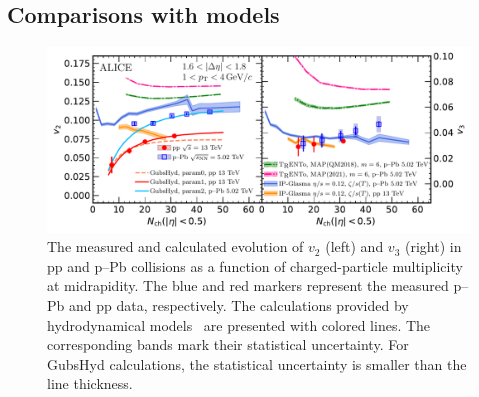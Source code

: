 \subsection{Comparisons with models}
\label{sec:theory}

\begin{figure}[h!]
	\centering
	\includegraphics[width=1.0\textwidth]{figures/FIG7_v2Mult_allSystems_Hydro.pdf} 
	\caption{The measured and calculated evolution of $v_2$ (left) and $v_3$ (right) in pp and p--Pb collisions as a function of charged-particle multiplicity at midrapidity.
The blue and red markers represent the measured p--Pb and pp data, respectively. The calculations provided by hydrodynamical models~\cite{Parkkila:2021yha,Bernhard:2016tnd,Schenke:2020mbo,Taghavi:2019mqz} are presented with colored lines. The corresponding bands mark their statistical uncertainty. For GubsHyd calculations, the statistical uncertainty is smaller than the line thickness.} 
	\label{fig:vnmult_model}
\end{figure}


